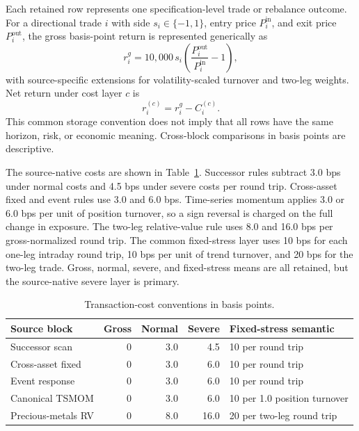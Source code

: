 Each retained row represents one specification-level trade or rebalance outcome. For a directional trade $i$ with side $s_i\in\{-1,1\}$, entry price $P_i^{\mathrm{in}}$, and exit price $P_i^{\mathrm{out}}$, the gross basis-point return is represented generically as
\begin{equation}
 r^{g}_{i}=10{,}000\,s_i\left(\frac{P_i^{\mathrm{out}}}{P_i^{\mathrm{in}}}-1\right),
\end{equation}
with source-specific extensions for volatility-scaled turnover and two-leg weights. Net return under cost layer $c$ is
\begin{equation}
 r^{(c)}_{i}=r^{g}_{i}-C^{(c)}_{i}.
\end{equation}
This common storage convention does not imply that all rows have the same horizon, risk, or economic meaning. Cross-block comparisons in basis points are descriptive.

The source-native costs are shown in Table~\ref{tab:costs}. Successor rules subtract 3.0 bps under normal costs and 4.5 bps under severe costs per round trip. Cross-asset fixed and event rules use 3.0 and 6.0 bps. Time-series momentum applies 3.0 or 6.0 bps per unit of position turnover, so a sign reversal is charged on the full change in exposure. The two-leg relative-value rule uses 8.0 and 16.0 bps per gross-normalized round trip. The common fixed-stress layer uses 10 bps for each one-leg intraday round trip, 10 bps per unit of trend turnover, and 20 bps for the two-leg trade. Gross, normal, severe, and fixed-stress means are all retained, but the source-native severe layer is primary.

\begin{table}[t]
\centering
\caption{Transaction-cost conventions in basis points.}\label{tab:costs}
\small
\begin{tabular}{lrrrp{4.1cm}}
\toprule
Source block & Gross & Normal & Severe & Fixed-stress semantic \\
\midrule
Successor scan & 0 & 3.0 & 4.5 & 10 per round trip \\
Cross-asset fixed & 0 & 3.0 & 6.0 & 10 per round trip \\
Event response & 0 & 3.0 & 6.0 & 10 per round trip \\
Canonical TSMOM & 0 & 3.0 & 6.0 & 10 per 1.0 position turnover \\
Precious-metals RV & 0 & 8.0 & 16.0 & 20 per two-leg round trip \\
\bottomrule
\end{tabular}
\end{table}

